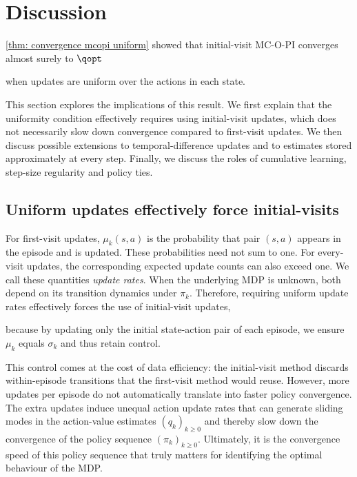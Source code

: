 
\section{Discussion}
\label{sec: discussion}

\autoref{thm: convergence mcopi uniform} showed that initial-visit MC-O-PI converges almost surely to $\qopt$

when updates are uniform over the actions in each state.








This section explores the implications of this result.
We first explain that the uniformity condition effectively requires using initial-visit updates, which does not necessarily slow down convergence compared to first-visit updates.
We then discuss possible extensions to temporal-difference updates and to estimates stored approximately at every step.
Finally, we discuss the roles of cumulative learning, step-size regularity and policy ties.








\subsection{Uniform updates effectively force initial-visits}


For first-visit updates, $\mu_k(s,a)$ is the probability that pair $(s,a)$ appears in the episode and is updated. These probabilities need not sum to one. For every-visit updates, the corresponding expected update counts can also exceed one. We call these quantities \emph{update rates}. When the underlying MDP is unknown, both depend on its transition dynamics under $\pi_k$.
Therefore, requiring uniform update rates effectively forces the use of initial-visit updates,

because by updating only the initial state-action pair of each episode, we ensure $\mu_k$ equals $\sigma_k$ and thus retain control.

This control comes at the cost of data efficiency: the initial-visit method discards within-episode transitions that the first-visit method would reuse. However, more updates per episode do not automatically translate into faster policy convergence.
The extra updates induce unequal action update rates that can generate sliding modes in the action-value estimates $(q_k)_{k \ge 0}$ and thereby slow down the convergence of the policy sequence $(\pi_k)_{k \ge 0}$. Ultimately, it is the convergence speed of this policy sequence that truly matters for identifying the optimal behaviour of the MDP.


